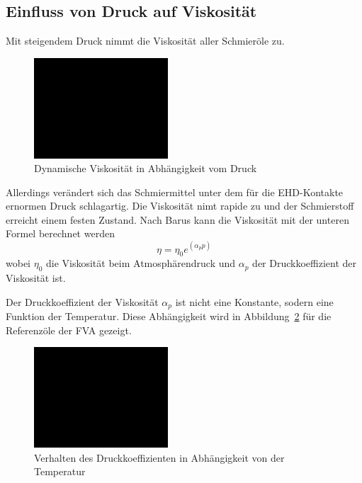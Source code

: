 \subsection*{Einfluss von Druck auf Viskosität}
\label{sub:einfluss_von_druck_auf_viskositaet}
Mit steigendem Druck nimmt die Viskosität aller Schmieröle zu.
\begin{figure}[htb]
    \centering
    \includegraphics[width=5cm]{./images/blank_img.jpg}
    \caption{Dynamische Viskosität in Abhängigkeit vom Druck}
    \label{fig:dynamische_viskositaet_in_abhaengigkeit_vom_druck}
\end{figure}
%
Allerdings verändert sich das Schmiermittel unter dem für die EHD-Kontakte ernormen Druck schlagartig.
Die Viskosität nimt rapide zu und der Schmierstoff erreicht einem festen Zustand.
Nach Barus kann die Viskosität mit der unteren Formel berechnet werden
\begin{equation}
    \eta = \eta_0  e^{(\alpha_p  p)}
    \label{eq:dynamische_viskositaet_druck_barus}
\end{equation}
%
wobei $\eta_0$ die Viskosität beim Atmosphärendruck und $\alpha_p$ der Druckkoeffizient der Viskosität ist.

Der Druckkoeffizient der Viskosität $\alpha_p$ ist nicht eine Konstante, sodern eine Funktion der Temperatur.
Diese Abhängigkeit wird in Abbildung~\ref{fig:druckkoeffizient_temperatur} für die Referenzöle der FVA gezeigt.
\begin{figure}[htb]
    \centering
    \includegraphics[width=5cm]{./images/blank_img.jpg}
    \caption{Verhalten des Druckkoeffizienten in Abhängigkeit von der Temperatur}
    \label{fig:druckkoeffizient_temperatur}
\end{figure}
%

